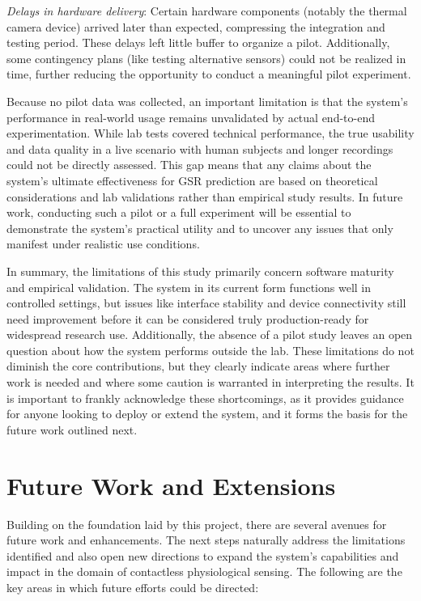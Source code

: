 \textit{Delays in hardware delivery}: Certain hardware components (notably the thermal camera device) arrived later than expected, compressing the integration and testing period. These delays left little buffer to organize a pilot. Additionally, some contingency plans (like testing alternative sensors) could not be realized in time, further reducing the opportunity to conduct a meaningful pilot experiment.

Because no pilot data was collected, an important limitation is that the system's performance in real-world usage remains unvalidated by actual end-to-end experimentation. While lab tests covered technical performance, the true usability and data quality in a live scenario with human subjects and longer recordings could not be directly assessed. This gap means that any claims about the system's ultimate effectiveness for GSR prediction are based on theoretical considerations and lab validations rather than empirical study results. In future work, conducting such a pilot or a full experiment will be essential to demonstrate the system's practical utility and to uncover any issues that only manifest under realistic use conditions.

In summary, the limitations of this study primarily concern software maturity and empirical validation. The system in its current form functions well in controlled settings, but issues like interface stability and device connectivity still need improvement before it can be considered truly production-ready for widespread research use. Additionally, the absence of a pilot study leaves an open question about how the system performs outside the lab. These limitations do not diminish the core contributions, but they clearly indicate areas where further work is needed and where some caution is warranted in interpreting the results. It is important to frankly acknowledge these shortcomings, as it provides guidance for anyone looking to deploy or extend the system, and it forms the basis for the future work outlined next.

\section{Future Work and Extensions}

Building on the foundation laid by this project, there are several avenues for future work and enhancements. The next steps naturally address the limitations identified and also open new directions to expand the system's capabilities and impact in the domain of contactless physiological sensing. The following are the key areas in which future efforts could be directed:


